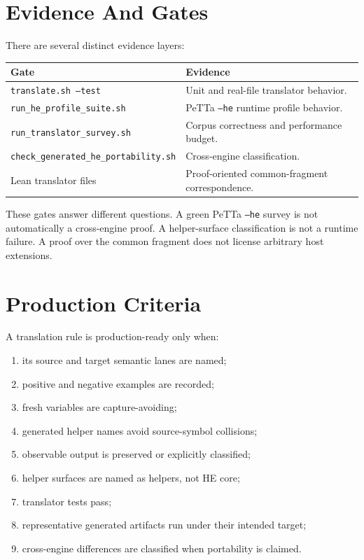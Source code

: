 \documentclass[11pt]{article}
\newcommand{\code}[1]{\texttt{#1}}
\newcommand{\HE}{\textup{HE}}
\newcommand{\PeTTa}{\textup{PeTTa}}
\begin{document}
\section{Evidence And Gates}

There are several distinct evidence layers:

\begin{center}
\begin{tabular}{ll}
\toprule
Gate & Evidence \\
\midrule
\code{translate.sh --test} & Unit and real-file translator behavior. \\
\code{run\_he\_profile\_suite.sh} & PeTTa \code{--he} runtime profile behavior. \\
\code{run\_translator\_survey.sh} & Corpus correctness and performance budget. \\
\code{check\_generated\_he\_portability.sh} & Cross-engine classification. \\
Lean translator files & Proof-oriented common-fragment correspondence. \\
\bottomrule
\end{tabular}
\end{center}

These gates answer different questions.  A green \PeTTa{} \code{--he} survey is
not automatically a cross-engine proof.  A helper-surface classification is not
a runtime failure.  A proof over the common fragment does not license arbitrary
host extensions.

\section{Production Criteria}

A translation rule is production-ready only when:
\begin{enumerate}
\item its source and target semantic lanes are named;
\item positive and negative examples are recorded;
\item fresh variables are capture-avoiding;
\item generated helper names avoid source-symbol collisions;
\item observable output is preserved or explicitly classified;
\item helper surfaces are named as helpers, not \HE{} core;
\item translator tests pass;
\item representative generated artifacts run under their intended target;
\item cross-engine differences are classified when portability is claimed.
\end{enumerate}
\end{document}
